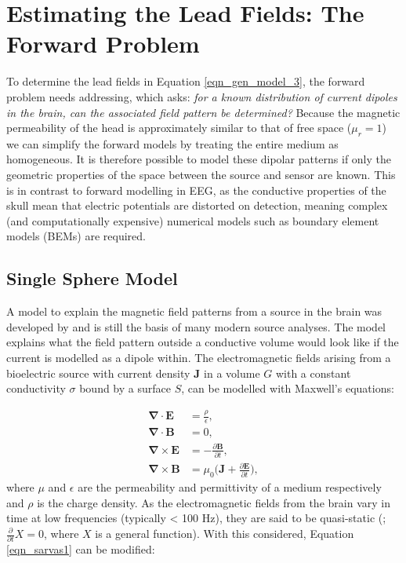 \section{Estimating the Lead Fields: The Forward Problem}\label{sec_forward_problemn}
To determine the lead fields in Equation \ref{eqn_gen_model_3}, the forward problem needs addressing, which asks: \emph{for a known distribution of current dipoles in the brain, can the associated field pattern be determined?}  Because the magnetic permeability of the head is approximately similar to that of free space ($\mu_r=1$) we can simplify the forward models by treating the entire medium as homogeneous. It is therefore possible to model these dipolar patterns if only the geometric properties of the space between the source and sensor are known. This is in contrast to forward modelling in EEG, as the conductive properties of the skull mean that electric potentials are distorted on detection, meaning complex (and computationally expensive) numerical models such as boundary element models (BEMs) are required.

\subsection{Single Sphere Model}

A model to explain the magnetic field patterns from a source in the brain was developed by \cite{Sarvas1987} and is still the basis of many modern source analyses. The model explains what the field pattern outside a conductive volume would look like if the current is modelled as a dipole within. The electromagnetic fields arising from a bioelectric source with current density $\mathbf{J}$ in a volume $G$ with a constant conductivity $\sigma$ bound by a surface $S$, can be modelled with Maxwell's equations:

\begin{equation}
	\begin{aligned}
		\mathbf{\nabla}\cdot\mathbf{E} &= \frac{\rho}{\epsilon}, \\
		\mathbf{\nabla}\cdot\mathbf{B} &= 0, \\
		\mathbf{\nabla}\times\mathbf{E} &= -\frac{\partial\mathbf{B}}{\partial t}, \\
		\mathbf{\nabla}\times\mathbf{B} &= \mu_0\bigg(\mathbf{J}+\frac{\partial\mathbf{E}}{\partial t}\bigg),
	\end{aligned}\label{eqn_sarvas1}
\end{equation} where $\mu$ and $\epsilon$ are the permeability and permittivity of a medium respectively and $\rho$ is the charge density. As the electromagnetic fields from the brain vary in time at low frequencies (typically < 100 Hz), they are said to be quasi-static (\citealp{Hamalainen1993}; $\frac{\partial}{\partial t}X = 0$, where $X$ is a general function). With this considered, Equation \ref{eqn_sarvas1} can be modified:

